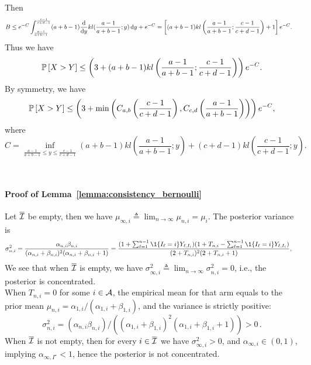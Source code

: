 	Then
	\begin{align*}
	B &\leq e^{-C} \int_{\frac{a-1}{a+b-1}}^{\frac{c-1}{c+d-1}} (a+b-1) \frac{\mathop{}\!\mathrm{d}{}}{\mathop{}\!\mathrm{d}{y}} kl (\frac{a-1}{a+b-1}; y) \mathop{}\!\mathrm{d}{y}  + e^{-C}
	= \left[ (a+b-1) kl\left(\frac{a-1}{a+b-1}; \frac{c-1}{c+d-1}\right)  + 1 \right] e^{-C}.
	\end{align*}
	Thus we have
	\begin{align*}
	\mathbb{P}\left[X > Y\right] \leq \left( 3 + (a+b-1) kl\left(\frac{a-1}{a+b-1}; \frac{c-1}{c+d-1}\right)  \right) e^{-C}.
	\end{align*}
	By symmetry, we have
	\begin{align*}
	\mathbb{P}\left[X > Y\right] \leq \left(3 + \min \left(C_{a,b}\left(\frac{c-1}{c+d-1}\right), C_{c,d}\left(\frac{a-1}{a+b-1}\right)\right)\right) e^{-C},
	\end{align*}
	where
	\[
	    C = \inf_{\frac{a-1}{a+b-1} \leq y \leq \frac{c-1}{c+d-1}} (a+b-1) kl\left(\frac{a-1}{a+b-1}; y\right) + (c+d-1) kl\left(\frac{c-1}{c+d-1} ; y\right).
	\]

\hfill\BlackBox\\[2mm]

\paragraph{Proof of Lemma~\ref{lemma:consistency_bernoulli}} 

Let $\overline{\mathcal{I}}$ be empty, then we have $\mu_{\infty, i} \triangleq \lim_{n \rightarrow \infty} \mu_{n,i} = \mu_i$. The posterior variance is
\begin{align*}
\sigma_{n,i}^2 &= \frac{\alpha_{n,i}\beta_{n,i}}{(\alpha_{n,i}+ \beta_{n,i})^2 (\alpha_{n,i} + \beta_{n,i} + 1)} 
= \frac{(1 + \sum_{\ell=1}^{n-1} \1{\{ I_{\ell} = i \}} Y_{\ell,I_{\ell}}) (1 + T_{n,i} - \sum_{\ell=1}^{n-1} \1{\{ I_{\ell} = i \}} Y_{\ell,I_{\ell}})  }{ (2 + T_{n,i})^2 (2 + T_{n,i} +1 )   },
\end{align*}
We see that when $\overline{\mathcal{I}}$ is empty, we have $\sigma_{\infty, i}^2 \triangleq \lim_{n \rightarrow \infty} \sigma_{n,i}^2 = 0$, i.e., the posterior is concentrated. \\

When $T_{n,i} = 0$ for some $i \in \mathcal{A}$, the empirical mean for that arm equals to the prior mean $\mu_{n,i} = \alpha_{1,i} / (\alpha_{1,i} + \beta_{1,i})$, and the variance is strictly positive: 
\[
    \sigma^2_{n,i} = (\alpha_{n,i}\beta_{n,i}) / \left((\alpha_{1,i}+ \beta_{1,i})^2 (\alpha_{1,i} + \beta_{1,i} + 1) \right) > 0\,.
\] 
When $\overline{\mathcal{I}}$ is not empty, then for every $i \in \overline{\mathcal{I}}$ we have $\sigma_{\infty, i}^2 > 0$, and $\alpha_{\infty, i} \in (0,1)$, implying $\alpha_{\infty, I^\star} < 1$, hence the posterior is not concentrated. 

\hfill\BlackBox\\[2mm]
